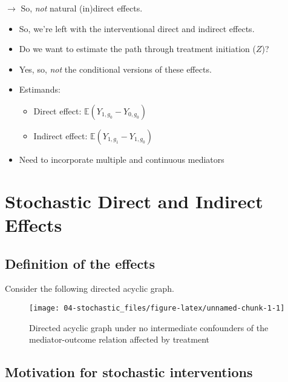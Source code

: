 \documentclass[
  12pt,
]{book}
\providecommand{\tightlist}{%
  \setlength{\itemsep}{0pt}\setlength{\parskip}{0pt}}
\theoremstyle{definition}
\theoremstyle{definition}
\theoremstyle{definition}
\newcommand{\E}{\mathbb{E}}
\newcommand{\1}{\mathbbm{1}}
\begin{document}
\(\rightarrow\) So, \emph{not} natural (in)direct effects.

\begin{itemize}
\tightlist
\item
  So, we're left with the interventional direct and indirect effects.
\item
  Do we want to estimate the path through treatment initiation (\(Z\))?
\item
  Yes, so, \emph{not} the conditional versions of these effects.
\item
  Estimands:

  \begin{itemize}
  \tightlist
  \item
    Direct effect: \(\E(Y_{1,g_0} - Y_{0,g_0})\)
  \item
    Indirect effect: \(\E(Y_{1,g_1} - Y_{1,g_0})\)
  \end{itemize}
\item
  Need to incorporate multiple and continuous mediators
\end{itemize}

\hypertarget{stochastic}{%
\chapter{Stochastic Direct and Indirect Effects}\label{stochastic}}

\hypertarget{definition-of-the-effects}{%
\section{Definition of the effects}\label{definition-of-the-effects}}

Consider the following directed acyclic graph.

\begin{figure}

{\centering \texttt{[image: 04-stochastic\_files/figure-latex/unnamed-chunk-1-1]} 

}

\caption{Directed acyclic graph under no intermediate confounders of the mediator-outcome relation affected by treatment}\label{fig:unnamed-chunk-1}
\end{figure}

\hypertarget{motivation-for-stochastic-interventions}{%
\section{Motivation for stochastic interventions}\label{motivation-for-stochastic-interventions}}
\end{document}
